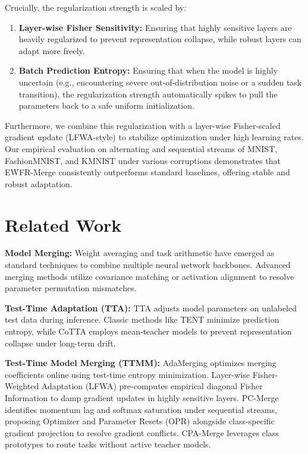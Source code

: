 \documentclass{article}
\theoremstyle{plain}
\theoremstyle{definition}
\theoremstyle{remark}
\begin{document}
Crucially, the regularization strength is scaled by:
\begin{enumerate}
    \item \textbf{Layer-wise Fisher Sensitivity:} Ensuring that highly sensitive layers are heavily regularized to prevent representation collapse, while robust layers can adapt more freely.
    \item \textbf{Batch Prediction Entropy:} Ensuring that when the model is highly uncertain (e.g., encountering severe out-of-distribution noise or a sudden task transition), the regularization strength automatically spikes to pull the parameters back to a safe uniform initialization.
\end{enumerate}

Furthermore, we combine this regularization with a layer-wise Fisher-scaled gradient update (LFWA-style) to stabilize optimization under high learning rates. Our empirical evaluation on alternating and sequential streams of MNIST, FashionMNIST, and KMNIST under various corruptions demonstrates that EWFR-Merge consistently outperforms standard baselines, offering stable and robust adaptation.

\section{Related Work}
\label{sec:related}

\textbf{Model Merging:} Weight averaging and task arithmetic \cite{task_arithmetic} have emerged as standard techniques to combine multiple neural network backbones. Advanced merging methods utilize covariance matching \cite{zipit} or activation alignment to resolve parameter permutation mismatches. 

\textbf{Test-Time Adaptation (TTA):} TTA adjusts model parameters on unlabeled test data during inference. Classic methods like TENT \cite{tent} minimize prediction entropy, while CoTTA \cite{cotta} employs mean-teacher models to prevent representation collapse under long-term drift.

\textbf{Test-Time Model Merging (TTMM):} AdaMerging \cite{adamerging} optimizes merging coefficients online using test-time entropy minimization. Layer-wise Fisher-Weighted Adaptation (LFWA) \cite{lfwa} pre-computes empirical diagonal Fisher Information to damp gradient updates in highly sensitive layers. PC-Merge \cite{pc_merge} identifies momentum lag and softmax saturation under sequential streams, proposing Optimizer and Parameter Resets (OPR) alongside class-specific gradient projection to resolve gradient conflicts. CPA-Merge \cite{cpa_merge} leverages class prototypes to route tasks without active teacher models. 
\end{document}
